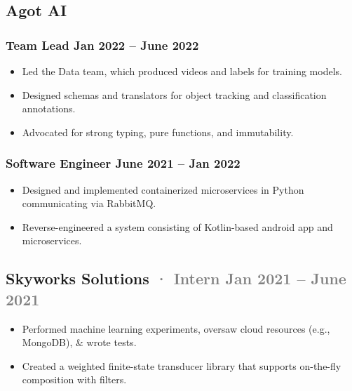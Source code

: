 \documentclass[12pt]{article} %
\providecommand{\tightlist}{%
  \setlength{\itemsep}{0pt}\setlength{\parskip}{0pt}}
\renewcommand{\emph}[1]{%
  \textcolor{gray}{#1}%
}
\begin{document}
\begin{paracol}{2}
\begin{raggedright}
\hypertarget{agot-ai}{%
\subsection{Agot AI}\label{agot-ai}}

\vspace{-3pt}

\hypertarget{team-lead-jan-2022-june-2022}{%
\subsubsection{\texorpdfstring{Team Lead \hfill Jan 2022 -- June
2022}{Team Lead Jan 2022 -- June 2022}}\label{team-lead-jan-2022-june-2022}}

\begin{itemize}
\tightlist
\item
  Led the Data team, which produced videos and labels for training
  models.
\item
  Designed schemas and translators for object tracking and
  classification annotations.
\item
  Advocated for strong typing, pure functions, and immutability.
\end{itemize}

\hypertarget{software-engineer-june-2021-jan-2022}{%
\subsubsection{\texorpdfstring{Software Engineer \hfill June 2021 -- Jan
2022}{Software Engineer June 2021 -- Jan 2022}}\label{software-engineer-june-2021-jan-2022}}

\begin{itemize}
\tightlist
\item
  Designed and implemented containerized microservices in Python
  communicating via RabbitMQ.
\item
  Reverse-engineered a system consisting of Kotlin-based android app and
  microservices.
\end{itemize}

\hypertarget{skyworks-solutions-intern-jan-2021-june-2021}{%
\subsection{\texorpdfstring{Skyworks Solutions \emph{· Intern \hfill Jan
2021 -- June
2021}}{Skyworks Solutions · Intern Jan 2021 -- June 2021}}\label{skyworks-solutions-intern-jan-2021-june-2021}}

\begin{itemize}
\tightlist
\item
  Performed machine learning experiments, oversaw cloud resources (e.g.,
  MongoDB), \& wrote tests.
\item
  Created a weighted finite-state transducer library that supports
  on-the-fly composition with filters.
\end{itemize}


\end{raggedright}
\end{paracol}
\end{document}
